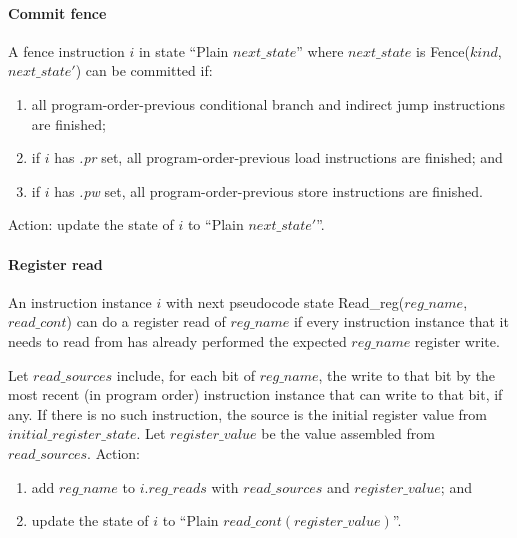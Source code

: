 \paragraph{Commit fence}\label{omm:commit_barrier}
A fence instruction $i$ in state ``{\sc Plain} $next\_state$'' where $next\_state$ is {\sc Fence}($kind$, $next\_state'$) can be committed if:
\begin{enumerate}
\item all program-order-previous conditional branch and indirect jump instructions are finished;
\item if $i$ has {\em .pr} set, all program-order-previous load instructions are finished; and
\item if $i$ has {\em .pw} set, all program-order-previous store instructions are finished.
\end{enumerate}
Action: update the state of $i$ to ``{\sc Plain} $next\_state'$''.


\paragraph{Register read}\label{omm:reg_read}
An instruction instance $i$ with next pseudocode state {\sc Read\_reg}($reg\_name$, $read\_cont$) can do a register read of $reg\_name$ if every instruction instance that it needs to read from has already performed the expected $reg\_name$ register write.

Let $read\_sources$ include, for each bit of $reg\_name$, the write to
that bit by the most recent (in program order) instruction instance that can write to that bit, if any. If there is no such instruction, the source is the initial register value from $initial\_register\_state$.
Let  $register\_value$ be the value assembled from $read\_sources$.
Action:
\begin{enumerate}
\item add $reg\_name$ to $i.reg\_reads$ with $read\_sources$ and $register\_value$; and
\item update the state of $i$ to ``{\sc Plain} $read\_cont(register\_value)$''.
\end{enumerate}


